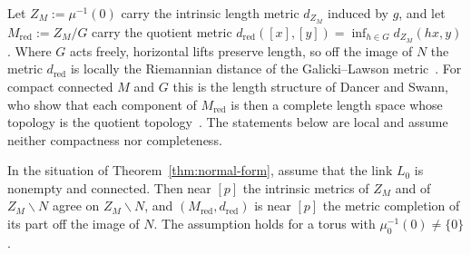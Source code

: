 Let $Z_M:=\mu^{-1}(0)$ carry the intrinsic length metric $d_{Z_M}$ induced by $g$, and let
$M_{\mathrm{red}}:=Z_M/G$ carry the quotient metric
$d_{\mathrm{red}}([x],[y])=\inf_{h\in G}d_{Z_M}(hx,y)$. Where $G$ acts freely, horizontal lifts
preserve length, so off the image of $N$ the metric $d_{\mathrm{red}}$ is locally the Riemannian
distance of the Galicki--Lawson metric~\cite{Galicki:1988}.
For compact connected $M$ and $G$ this is the length structure of Dancer and Swann, who show that each
component of $M_{\mathrm{red}}$ is then a complete length space whose topology is the quotient
topology~\cite[Sect.~7, Thm.~7.1]{DancerSwann:1997}. The statements below are local and assume
neither compactness nor completeness.

\begin{lemma}\label{lem:reduced-metric}
In the situation of Theorem~\ref{thm:normal-form}, assume that the link $L_0$ is nonempty and
connected. Then near $[p]$ the intrinsic metrics of $Z_M$ and of $Z_M\smallsetminus N$ agree on
$Z_M\smallsetminus N$, and $(M_{\mathrm{red}},d_{\mathrm{red}})$ is near $[p]$ the metric
completion of its part off the image of $N$. The assumption holds for a torus with
$\mu_0^{-1}(0)\neq\{0\}$.
\end{lemma}

